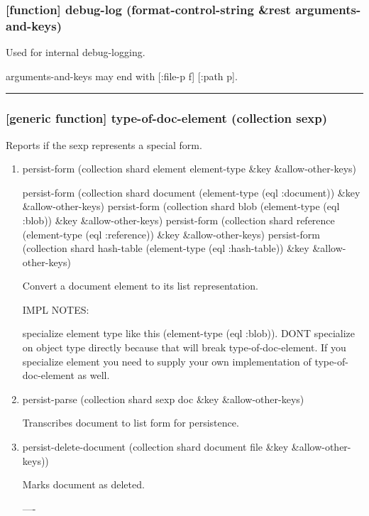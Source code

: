 \documentclass[11pt]{article}
\begin{document}
\subsubsection{[function] debug-log (format-control-string \&rest arguments-and-keys)}
\label{sec:org9ac58c8}

Used for internal debug-logging.

arguments-and-keys may end with [:file-p f] [:path p].

\noindent\rule{\textwidth}{0.5pt}

\subsubsection{[generic function] type-of-doc-element (collection sexp)}
\label{sec:orgfd93b06}

Reports if the sexp represents a special form.

\begin{enumerate}
\item{} persist-form (collection shard element element-type \&key \&allow-other-keys)
\label{sec:orgbea3e7c}

persist-form (collection shard document (element-type (eql :document)) \&key \&allow-other-keys)
persist-form (collection shard blob (element-type (eql :blob)) \&key \&allow-other-keys)
persist-form (collection shard reference (element-type (eql :reference)) \&key \&allow-other-keys)
persist-form (collection shard hash-table (element-type (eql :hash-table)) \&key \&allow-other-keys)

Convert a document element to its list representation.

IMPL NOTES:

specialize element type like this (element-type (eql :blob)). DONT
specialize on object type directly because that will break
type-of-doc-element. If you specialize element you need to supply your
own implementation of type-of-doc-element as well.

\item{} persist-parse (collection shard sexp doc \&key \&allow-other-keys)
\label{sec:org83bc6d1}

Transcribes document to list form for persistence.

\item{} persist-delete-document (collection shard document file \&key \&allow-other-keys))
\label{sec:org0805ef8}

Marks document as deleted.

----
\end{enumerate}
\end{document}
